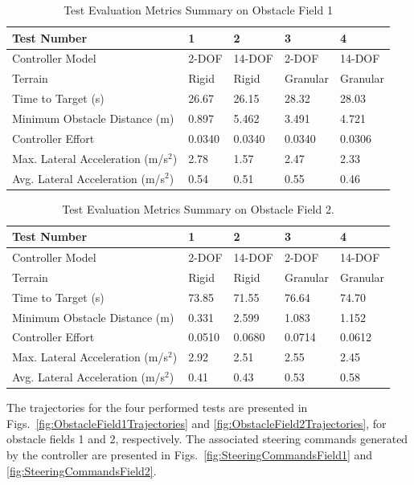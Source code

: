 \documentclass[12pt,onecolumn]{article}
\begin{document}
\begin{table}
		\centering
\begin{tabular}{ ||p{6cm}|p{1.8cm}|p{1.8cm}|p{1.8cm}|p{1.8cm}||  }
		\hline
		Test Number & 1 & 2 & 3 & 4\\
		\hline
		Controller Model & 2-DOF & 14-DOF & 2-DOF & 14-DOF\\
		\hline
		Terrain & Rigid & Rigid & Granular & Granular\\
		\hline
		Time to Target (s)  & 26.67 & 26.15 & 28.32 & 28.03\\ 
		\hline
		Minimum Obstacle Distance (m) & 0.897 & 5.462 & 3.491 & 4.721\\
		\hline
		Controller Effort & 0.0340 & 0.0340 & 0.0340 & 0.0306\\
		\hline
		Max. Lateral Acceleration (m/s$^{2}$)& 2.78 & 1.57 & 2.47 & 2.33 \\
		\hline
		Avg. Lateral Acceleration (m/s$^{2}$) &0.54 & 0.51 & 0.55 & 0.46\\
		\hline
\end{tabular}
\caption{Test Evaluation Metrics Summary on Obstacle Field 1}
\label{t:EvalMetricsObst1}
\end{table}

\begin{table}
		\centering
\begin{tabular}{ ||p{6cm}|p{1.8cm}|p{1.8cm}|p{1.8cm}|p{1.8cm}||  }
		\hline
		Test Number & 1 & 2 & 3 & 4\\
		\hline
		Controller Model & 2-DOF & 14-DOF & 2-DOF & 14-DOF\\
		\hline
		Terrain & Rigid & Rigid & Granular & Granular\\
		\hline
		Time to Target (s)  & 73.85 & 71.55 & 76.64 & 74.70\\ 
		\hline
		Minimum Obstacle Distance (m) & 0.331 & 2.599 & 1.083 & 1.152\\
		\hline
		Controller Effort & 0.0510 & 0.0680 & 0.0714 & 0.0612\\
		\hline
		Max. Lateral Acceleration (m/s$^{2}$)& 2.92 & 2.51 & 2.55 & 2.45 \\
		\hline
		Avg. Lateral Acceleration (m/s$^{2}$) & 0.41 & 0.43 & 0.53 & 0.58\\
		\hline
\end{tabular}
\caption{Test Evaluation Metrics Summary on Obstacle Field 2.}
\label{t:EvalMetricsObst2}
\end{table}

The trajectories for the four performed tests are presented in Figs.~\ref{fig:ObstacleField1Trajectories} and \ref{fig:ObstacleField2Trajectories}, for obstacle fields 1 and 2, respectively. The associated steering commands generated by the controller are presented in Figs.~\ref{fig:SteeringCommandsField1} and \ref{fig:SteeringCommandsField2}. 
\end{document}
